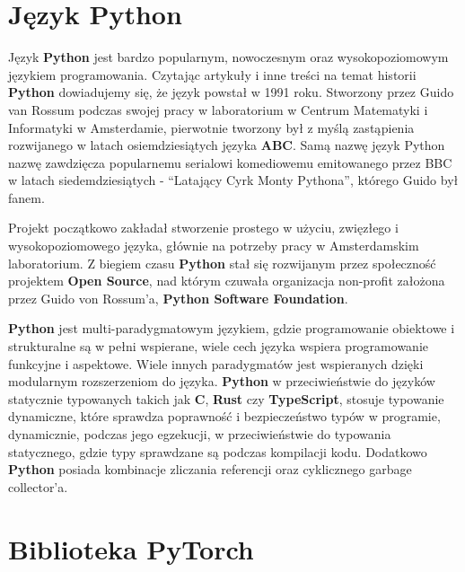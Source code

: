


\section{Język Python}
Język \textbf{Python} jest bardzo popularnym, nowoczesnym oraz wysokopoziomowym językiem programowania. Czytając artykuły i inne treści na temat historii \textbf{Python} \cite{HistoriaPythona} \cite{WikiepdiaPythonProgrammingLanauge} dowiadujemy się, że język powstał w 1991 roku. Stworzony przez Guido van Rossum podczas swojej pracy w laboratorium w Centrum Matematyki i Informatyki w Amsterdamie, pierwotnie tworzony był z myślą zastąpienia rozwijanego w latach osiemdziesiątych języka \textbf{ABC}. Samą nazwę język Python nazwę zawdzięcza popularnemu serialowi komediowemu emitowanego przez BBC w latach siedemdziesiątych - ``Latający Cyrk Monty Pythona'', którego Guido był fanem.

Projekt początkowo zakładał stworzenie prostego w użyciu, zwięzłego i wysokopoziomowego języka, głównie na potrzeby pracy w Amsterdamskim laboratorium. Z biegiem czasu \textbf{Python} stał się rozwijanym przez społeczność projektem \textbf{Open Source}, nad którym czuwała organizacja non-profit założona przez Guido von Rossum'a, \textbf{Python Software Foundation}.

\textbf{Python} jest multi-paradygmatowym językiem, gdzie programowanie obiektowe i strukturalne są w pełni wspierane, wiele cech języka wspiera programowanie funkcyjne i aspektowe. Wiele innych paradygmatów jest wspieranych dzięki modularnym rozszerzeniom do języka.
\textbf{Python} w przeciwieństwie do języków statycznie typowanych takich jak \textbf{C}, \textbf{Rust} czy \textbf{TypeScript}, stosuje typowanie dynamiczne, które sprawdza poprawność i bezpieczeństwo typów w programie, dynamicznie, podczas jego egzekucji, w przeciwieństwie do typowania statycznego, gdzie typy sprawdzane są podczas kompilacji kodu. Dodatkowo \textbf{Python} posiada kombinacje zliczania referencji oraz cyklicznego garbage collector'a.




\section{Biblioteka PyTorch}


